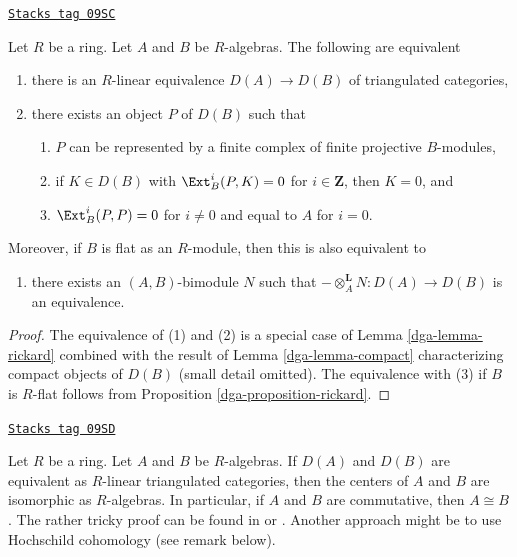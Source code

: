 \begin{lemma}
\label{dga-lemma-rickard-rings}
\href{https://stacks.math.columbia.edu/tag/09SC}{\texttt{Stacks tag 09SC}}

Let $R$ be a ring.
Let $A$ and $B$ be $R$-algebras. The following are equivalent
\begin{enumerate}
\item there is an $R$-linear equivalence $D(A) \to D(B)$
of triangulated categories,
\item there exists an object $P$ of $D(B)$ such that
\begin{enumerate}
\item $P$ can be represented by a finite complex
of finite projective $B$-modules,
\item if $K \in D(B)$ with $\Ext^i_B(P, K) = 0$ for
$i \in \mathbf{Z}$, then $K = 0$, and
\item $\Ext^i_B(P, P) = 0$ for $i \not = 0$ and
equal to $A$ for $i= 0$.
\end{enumerate}
\end{enumerate}
Moreover, if $B$ is flat as an $R$-module, then this is also
equivalent to
\begin{enumerate}
\item[(3)] there exists an $(A, B)$-bimodule $N$ such that
$- \otimes_A^\mathbf{L} N : D(A) \to D(B)$ is an equivalence.
\end{enumerate}
\end{lemma}

\begin{proof}

The equivalence of (1) and (2) is a special case of
Lemma \ref{dga-lemma-rickard} combined with the result of
Lemma \ref{dga-lemma-compact} characterizing compact objects of $D(B)$
(small detail omitted).
The equivalence with (3) if $B$ is $R$-flat follows from
Proposition \ref{dga-proposition-rickard}.
\end{proof}

\begin{remark}[Centers]
\label{dga-remark-centers}
\href{https://stacks.math.columbia.edu/tag/09SD}{\texttt{Stacks tag 09SD}}

Let $R$ be a ring. Let $A$ and $B$ be $R$-algebras.
If $D(A)$ and $D(B)$ are equivalent as $R$-linear triangulated
categories, then the centers of $A$ and $B$ are isomorphic
as $R$-algebras. In particular, if $A$ and $B$ are commutative,
then $A \cong B$. The rather tricky proof can be found in
\cite[Proposition 9.2]{Rickard} or \cite[Proposition 6.3.2]{KZ}.
Another approach might be to use Hochschild cohomology (see
remark below).
\end{remark}

